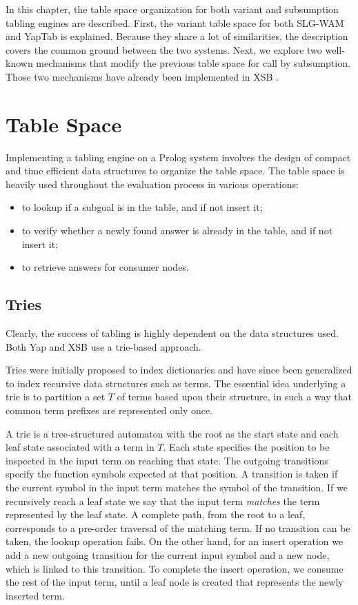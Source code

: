 
In this chapter, the table space organization for both variant and subsumption tabling
engines are described. First, the variant table space for both SLG-WAM and YapTab is
explained. Because they share a lot of similarities, the description covers the common
ground between the two systems. Next, we explore two well-known mechanisms that modify
the previous table space for call by subsumption. Those two mechanisms have already been
implemented in XSB \cite{Rao-96, Johnson-99}.

\section{Table Space} \label{sec:table_space}

Implementing a tabling engine on a Prolog system involves the design of compact and time efficient data structures
to organize the table space. The table space is heavily used throughout the evaluation process in various operations:

\begin{itemize}
  \item to lookup if a subgoal is in the table, and if not insert it;
  \item to verify whether a newly found answer is already in the table, and if not insert it;
  \item to retrieve answers for consumer nodes.
\end{itemize}

\subsection{Tries}

Clearly, the success of tabling is highly dependent on the data structures used.
Both Yap \cite{Rocha-00a} and XSB \cite{RamakrishnanIV-95} use a trie-based approach.

Tries were initially proposed to index dictionaries \cite{Fredkin-62} and have since been generalized to index recursive data structures
such as terms. The essential idea underlying a trie is to partition a set $T$ of terms based upon their structure,
in such a way that common term prefixes are represented only once.

A trie is a tree-structured automaton with the root as the start state and each leaf state associated with a term in $T$.
Each state specifies the position to be inspected in the input term on reaching that state.
The outgoing transitions specify the function symbols expected at that position.
A transition is taken if the current symbol in the input term matches the symbol of the transition.
If we recursively reach a leaf state we say that the input term \textit{matches} the term represented by the leaf state.
A complete path, from the root to a leaf, corresponds to a pre-order traversal of the matching term.
If no transition can be taken, the lookup operation fails. On the other hand, for an insert operation
we add a new outgoing transition for the current input symbol and a new node, which is linked to this transition.
To complete the insert operation, we consume the rest of the input term, until a leaf node is created that represents
the newly inserted term.

